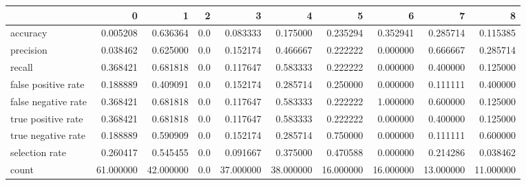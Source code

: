 \begin{tabular}{lrrrrrrrrr}
\toprule
{} &          0 &          1 &    2 &          3 &          4 &          5 &          6 &          7 &          8 \\
\midrule
accuracy            &   0.005208 &   0.636364 &  0.0 &   0.083333 &   0.175000 &   0.235294 &   0.352941 &   0.285714 &   0.115385 \\
precision           &   0.038462 &   0.625000 &  0.0 &   0.152174 &   0.466667 &   0.222222 &   0.000000 &   0.666667 &   0.285714 \\
recall              &   0.368421 &   0.681818 &  0.0 &   0.117647 &   0.583333 &   0.222222 &   0.000000 &   0.400000 &   0.125000 \\
false positive rate &   0.188889 &   0.409091 &  0.0 &   0.152174 &   0.285714 &   0.250000 &   0.000000 &   0.111111 &   0.400000 \\
false negative rate &   0.368421 &   0.681818 &  0.0 &   0.117647 &   0.583333 &   0.222222 &   1.000000 &   0.600000 &   0.125000 \\
true positive rate  &   0.368421 &   0.681818 &  0.0 &   0.117647 &   0.583333 &   0.222222 &   0.000000 &   0.400000 &   0.125000 \\
true negative rate  &   0.188889 &   0.590909 &  0.0 &   0.152174 &   0.285714 &   0.750000 &   0.000000 &   0.111111 &   0.600000 \\
selection rate      &   0.260417 &   0.545455 &  0.0 &   0.091667 &   0.375000 &   0.470588 &   0.000000 &   0.214286 &   0.038462 \\
count               &  61.000000 &  42.000000 &  0.0 &  37.000000 &  38.000000 &  16.000000 &  16.000000 &  13.000000 &  11.000000 \\
\bottomrule
\end{tabular}
